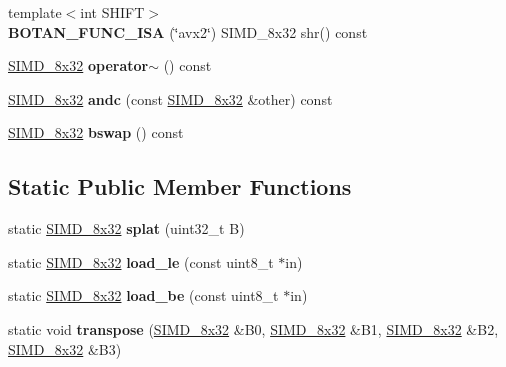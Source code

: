 \begin{DoxyCompactItemize}
{\footnotesize template$<$int S\+H\+I\+FT$>$ }\\{\bfseries B\+O\+T\+A\+N\+\_\+\+F\+U\+N\+C\+\_\+\+I\+SA} (\char`\"{}avx2\char`\"{}) S\+I\+M\+D\+\_\+8x32 shr() const
\item 
\mbox{\label{class_botan_1_1_s_i_m_d__8x32_aae87feeef7cf36d7c8f9ede6ca000b49}} 
\mbox{\hyperlink{class_botan_1_1_s_i_m_d__8x32}{S\+I\+M\+D\+\_\+8x32}} {\bfseries operator$\sim$} () const
\item 
\mbox{\label{class_botan_1_1_s_i_m_d__8x32_a98ad2c6adda113991d4f31164abef98a}} 
\mbox{\hyperlink{class_botan_1_1_s_i_m_d__8x32}{S\+I\+M\+D\+\_\+8x32}} {\bfseries andc} (const \mbox{\hyperlink{class_botan_1_1_s_i_m_d__8x32}{S\+I\+M\+D\+\_\+8x32}} \&other) const
\item 
\mbox{\label{class_botan_1_1_s_i_m_d__8x32_aaebf14ebd58e961f8cea1a914da1a8a0}} 
\mbox{\hyperlink{class_botan_1_1_s_i_m_d__8x32}{S\+I\+M\+D\+\_\+8x32}} {\bfseries bswap} () const
\end{DoxyCompactItemize}
\subsection*{Static Public Member Functions}
\begin{DoxyCompactItemize}
\item 
\mbox{\label{class_botan_1_1_s_i_m_d__8x32_a563388ad98f5ac7863e75e869f336de3}} 
static \mbox{\hyperlink{class_botan_1_1_s_i_m_d__8x32}{S\+I\+M\+D\+\_\+8x32}} {\bfseries splat} (uint32\+\_\+t B)
\item 
\mbox{\label{class_botan_1_1_s_i_m_d__8x32_a9d63723eefd26369932a2fb9042d8842}} 
static \mbox{\hyperlink{class_botan_1_1_s_i_m_d__8x32}{S\+I\+M\+D\+\_\+8x32}} {\bfseries load\+\_\+le} (const uint8\+\_\+t $\ast$in)
\item 
\mbox{\label{class_botan_1_1_s_i_m_d__8x32_a67366e80881d3f32bb20801302688923}} 
static \mbox{\hyperlink{class_botan_1_1_s_i_m_d__8x32}{S\+I\+M\+D\+\_\+8x32}} {\bfseries load\+\_\+be} (const uint8\+\_\+t $\ast$in)
\item 
\mbox{\label{class_botan_1_1_s_i_m_d__8x32_af63a005a5cbb31ac30f6b79ebe9e8b03}} 
static void {\bfseries transpose} (\mbox{\hyperlink{class_botan_1_1_s_i_m_d__8x32}{S\+I\+M\+D\+\_\+8x32}} \&B0, \mbox{\hyperlink{class_botan_1_1_s_i_m_d__8x32}{S\+I\+M\+D\+\_\+8x32}} \&B1, \mbox{\hyperlink{class_botan_1_1_s_i_m_d__8x32}{S\+I\+M\+D\+\_\+8x32}} \&B2, \mbox{\hyperlink{class_botan_1_1_s_i_m_d__8x32}{S\+I\+M\+D\+\_\+8x32}} \&B3)
\end{DoxyCompactItemize}


